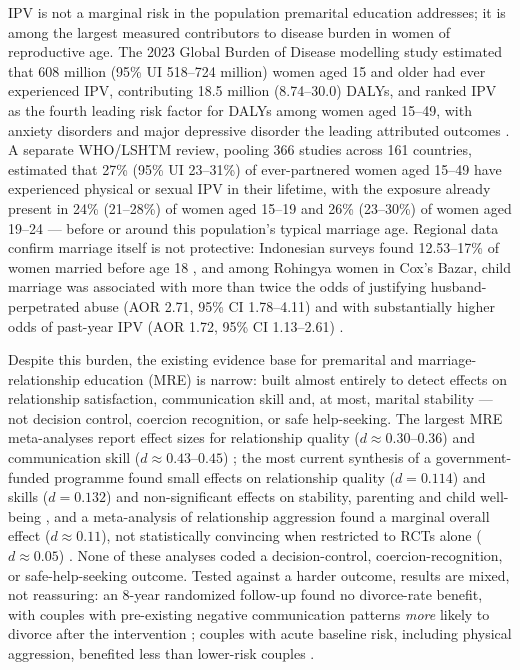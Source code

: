 
IPV is not a marginal risk in the population premarital education addresses; it is among the largest measured contributors to disease burden in women of reproductive age. The 2023 Global Burden of Disease modelling study estimated that 608 million (95\% UI 518--724 million) women aged 15 and older had ever experienced IPV, contributing 18.5 million (8.74--30.0) DALYs, and ranked IPV as the fourth leading risk factor for DALYs among women aged 15--49, with anxiety disorders and major depressive disorder the leading attributed outcomes \cite{ref1}. A separate WHO/LSHTM review, pooling 366 studies across 161 countries, estimated that 27\% (95\% UI 23--31\%) of ever-partnered women aged 15--49 have experienced physical or sexual IPV in their lifetime, with the exposure already present in 24\% (21--28\%) of women aged 15--19 and 26\% (23--30\%) of women aged 19--24 \cite{ref2} --- before or around this population's typical marriage age. Regional data confirm marriage itself is not protective: Indonesian surveys found 12.53--17\% of women married before age 18 \cite{ref3,ref4}, and among Rohingya women in Cox's Bazar, child marriage was associated with more than twice the odds of justifying husband-perpetrated abuse (AOR 2.71, 95\% CI 1.78--4.11) and with substantially higher odds of past-year IPV (AOR 1.72, 95\% CI 1.13--2.61) \cite{ref5}.

Despite this burden, the existing evidence base for premarital and marriage-relationship education (MRE) is narrow: built almost entirely to detect effects on relationship satisfaction, communication skill and, at most, marital stability --- not decision control, coercion recognition, or safe help-seeking. The largest MRE meta-analyses report effect sizes for relationship quality ($d\approx 0.30$--$0.36$) and communication skill ($d\approx 0.43$--$0.45$) \cite{ref6}; the most current synthesis of a government-funded programme found small effects on relationship quality ($d=0.114$) and skills ($d=0.132$) and non-significant effects on stability, parenting and child well-being \cite{ref7}, and a meta-analysis of relationship aggression found a marginal overall effect ($d\approx 0.11$), not statistically convincing when restricted to RCTs alone ($d\approx 0.05$) \cite{ref8}. None of these analyses coded a decision-control, coercion-recognition, or safe-help-seeking outcome. Tested against a harder outcome, results are mixed, not reassuring: an 8-year randomized follow-up found no divorce-rate benefit, with couples with pre-existing negative communication patterns \emph{more} likely to divorce after the intervention \cite{ref9}; couples with acute baseline risk, including physical aggression, benefited less than lower-risk couples \cite{ref10}.

